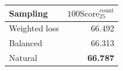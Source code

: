 \centering
{}
\label{tab:sampling}
\fontsize{8}{9.6}\selectfont
\setlength{\tabcolsep}{3pt}
\begin{tabularx}{\columnwidth}{@{}Xr@{}}
\toprule
\rowcolor{valfill} Sampling & $100\mathrm{Score}_{25}^{\mathrm{count}}$\\
\midrule
Weighted loss & 66.492\\
Balanced & 66.313\\
\rowcolor{learnfill}Natural & \textbf{66.787}\\
\bottomrule
\end{tabularx}
